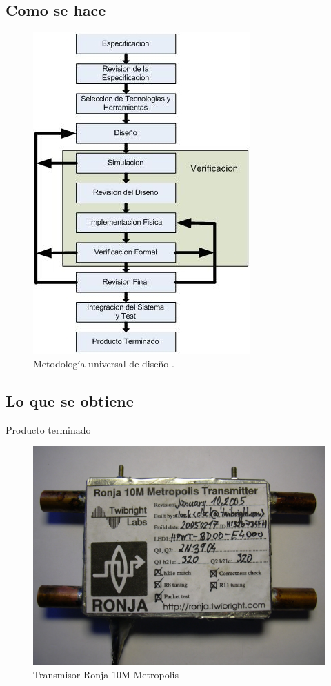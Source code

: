\documentclass{beamer}
\begin{document}
\subsection{Como se hace}

\begin{frame}
  \begin{figure}
    \includegraphics[scale=0.6]{img/metodologia}
    \caption{Metodología universal de diseño \cite{Guillermo}.}
    \label{fig:metodologia}
  \end{figure}
\end{frame}

\subsection{Lo que se obtiene}

\begin{frame}{Producto terminado}
  \begin{figure}
    \includegraphics[scale=0.85]{transmisor/1b80}
    \caption{Transmisor Ronja 10M Metropolis}
  \end{figure}
\end{frame}
\end{document}
